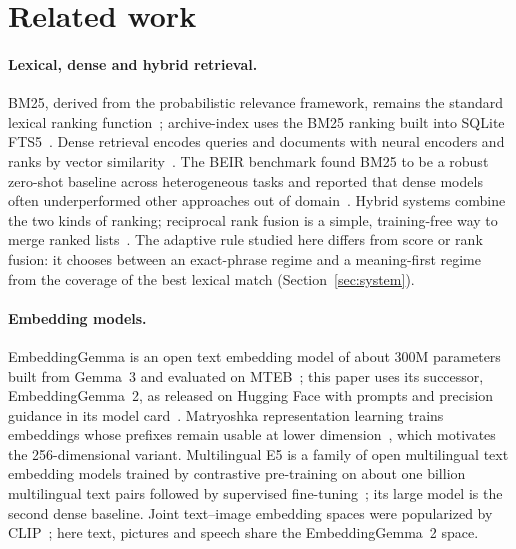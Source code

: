\section{Related work}\label{sec:related}

\paragraph{Lexical, dense and hybrid retrieval.}
BM25, derived from the probabilistic relevance framework, remains the standard lexical ranking function~\citep{robertson2009bm25}; archive-index uses the BM25 ranking built into SQLite FTS5~\citep{sqlitefts5}. Dense retrieval encodes queries and documents with neural encoders and ranks by vector similarity~\citep{reimers2019sbert,karpukhin2020dpr}. The BEIR benchmark found BM25 to be a robust zero-shot baseline across heterogeneous tasks and reported that dense models often underperformed other approaches out of domain~\citep{thakur2021beir}. Hybrid systems combine the two kinds of ranking; reciprocal rank fusion is a simple, training-free way to merge ranked lists~\citep{cormack2009rrf}. The adaptive rule studied here differs from score or rank fusion: it chooses between an exact-phrase regime and a meaning-first regime from the coverage of the best lexical match (Section~\ref{sec:system}).

\paragraph{Embedding models.}
EmbeddingGemma is an open text embedding model of about 300M parameters built from Gemma~3 and evaluated on MTEB~\citep{vera2025embeddinggemma}; this paper uses its successor, EmbeddingGemma~2, as released on Hugging Face with prompts and precision guidance in its model card~\citep{google2026embeddinggemma2card}. Matryoshka representation learning trains embeddings whose prefixes remain usable at lower dimension~\citep{kusupati2022matryoshka}, which motivates the 256-dimensional variant. Multilingual E5 is a family of open multilingual text embedding models trained by contrastive pre-training on about one billion multilingual text pairs followed by supervised fine-tuning~\citep{wang2024me5}; its large model is the second dense baseline. Joint text--image embedding spaces were popularized by CLIP~\citep{radford2021clip}; here text, pictures and speech share the EmbeddingGemma~2 space.

